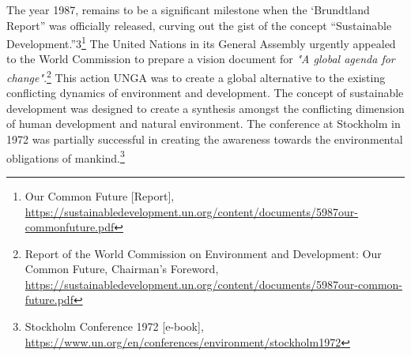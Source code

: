 \setcounter{figure}{0}
\setcounter{table}{0}
\setcounter{footnote}{0}




\begin{multicols}{2}


\noi
The year 1987, remains to be a significant milestone when the ‘Brundtland Report” was
officially released, curving out the gist of the concept “Sustainable Development.”3\footnote{Our Common Future [Report], \url{https://sustainabledevelopment.un.org/content/documents/5987our-commonfuture.pdf}}
 The
United Nations in its General Assembly urgently appealed to the World Commission to
prepare a vision document for \textit{"A global agenda for change"}.\footnote{Report of the World Commission on Environment and Development: Our Common Future, Chairman’s Foreword, \url{https://sustainabledevelopment.un.org/content/documents/5987our-common-future.pdf}}
 This action UNGA was to
create a global alternative to the existing conflicting dynamics of environment and
development. The concept of sustainable development was designed to create a synthesis
amongst the conflicting dimension of human development and natural environment. The
conference at Stockholm in 1972 was partially successful in creating the awareness towards
the environmental obligations of mankind.\footnote{Stockholm Conference 1972 [e-book], \url{https://www.un.org/en/conferences/environment/stockholm1972}}


\end{multicols}
